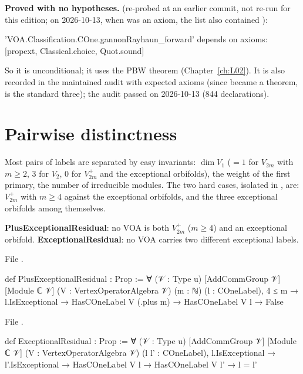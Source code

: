 \begin{status}
\textbf{Proved with no hypotheses.}  (re-probed at an earlier commit, not re-run for this edition; on
2026-10-13, when  was an axiom, the list also contained ):
\begin{plaincode}
'VOA.Classification.COne.gannonRayhaun_forward' depends on axioms:
  [propext, Classical.choice, Quot.sound]
\end{plaincode}
So it is unconditional; it uses the PBW theorem  (Chapter~\ref{ch:L02}). It is also recorded in the
maintained audit  with expected axioms
 (since  became a theorem,  is the standard three); the audit passed on 2026-10-13
(844 declarations).
\end{status}

\section{Pairwise distinctness}\label{l22:sec:distinct}

Most pairs of labels are separated by easy invariants: $\dim V_1$ ($=1$ for $V_{2m}$ with $m\ge2$, $3$ for $V_2$,
$0$ for $V_{2m}^+$ and the exceptional orbifolds), the weight of the first primary, the number of irreducible modules.
The two hard cases, isolated in ,
are: $V_{2m}^+$ with $m\ge4$ against the exceptional orbifolds, and the three exceptional orbifolds among themselves.

\begin{definition}\label{l22:def:residuals}
\textbf{PlusExceptionalResidual}: no VOA is both $V_{2m}^+$ ($m\ge4$) and an exceptional orbifold.
\textbf{ExceptionalResidual}: no VOA carries two different exceptional labels.
\end{definition}
\noindent File .
\begin{leancode}
def PlusExceptionalResidual : Prop :=
  ∀ (𝒱 : Type u) [AddCommGroup 𝒱] [Module ℂ 𝒱] (V : VertexOperatorAlgebra 𝒱) (m : ℕ)
    (l : COneLabel), 4 ≤ m → l.IsExceptional → HasCOneLabel V (.plus m) → HasCOneLabel V l → False
\end{leancode}
\noindent File .
\begin{leancode}
def ExceptionalResidual : Prop :=
  ∀ (𝒱 : Type u) [AddCommGroup 𝒱] [Module ℂ 𝒱] (V : VertexOperatorAlgebra 𝒱) (l l' : COneLabel),
    l.IsExceptional → l'.IsExceptional → HasCOneLabel V l → HasCOneLabel V l' → l = l'
\end{leancode}

